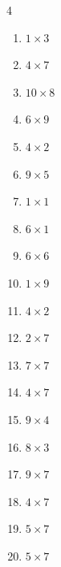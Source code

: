 \begin{multicols}{4}
\begin{enumerate}
  \item $1\times 3$
        \phantom{$=3$}

  \item $4\times 7$
        \phantom{$=28$}

  \item $10\times 8$
        \phantom{$=80$}

  \item $6\times 9$
        \phantom{$=54$}

  \item $4\times 2$
        \phantom{$=8$}

  \item $9\times 5$
        \phantom{$=45$}

  \item $1\times 1$
        \phantom{$=1$}

  \item $6\times 1$
        \phantom{$=6$}

\columnbreak %

\resetques

  \item $6\times 6$
        \phantom{$=36$}

  \item $1\times 9$
        \phantom{$=9$}

  \item $4\times 2$
        \phantom{$=8$}

  \item $2\times 7$
        \phantom{$=14$}

  \item $7\times 7$
        \phantom{$=49$}

  \item $4\times 7$
        \phantom{$=28$}

  \item $9\times 4$
        \phantom{$=36$}

  \item $8\times 3$
        \phantom{$=24$}

  \item $9\times 7$
        \phantom{$=63$}

  \item $4\times 7$
        \phantom{$=28$}

  \item $5\times 7$
        \phantom{$=35$}

  \item $5\times 7$
        \phantom{$=35$}


\end{enumerate}
\end{multicols}
